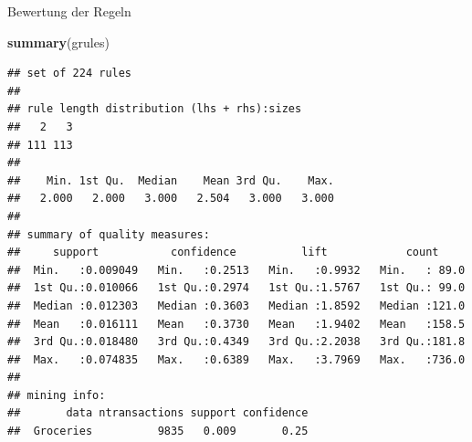 \documentclass[12pt,ngerman,a4paper,ignorenonframetext,]{beamer}
\newenvironment{Shaded}{\begin{snugshade}}{\end{snugshade}}
\newcommand{\KeywordTok}[1]{\textcolor[rgb]{0.13,0.29,0.53}{\textbf{#1}}}
\newcommand{\NormalTok}[1]{#1}
\begin{document}
\begin{frame}{Bewertung der Regeln}
\protect\hypertarget{bewertung-der-regeln}{}

\begin{Shaded}
\begin{Highlighting}[]
\KeywordTok{summary}\NormalTok{(grules)}
\end{Highlighting}
\end{Shaded}

\begin{verbatim}
## set of 224 rules
## 
## rule length distribution (lhs + rhs):sizes
##   2   3 
## 111 113 
## 
##    Min. 1st Qu.  Median    Mean 3rd Qu.    Max. 
##   2.000   2.000   3.000   2.504   3.000   3.000 
## 
## summary of quality measures:
##     support           confidence          lift            count      
##  Min.   :0.009049   Min.   :0.2513   Min.   :0.9932   Min.   : 89.0  
##  1st Qu.:0.010066   1st Qu.:0.2974   1st Qu.:1.5767   1st Qu.: 99.0  
##  Median :0.012303   Median :0.3603   Median :1.8592   Median :121.0  
##  Mean   :0.016111   Mean   :0.3730   Mean   :1.9402   Mean   :158.5  
##  3rd Qu.:0.018480   3rd Qu.:0.4349   3rd Qu.:2.2038   3rd Qu.:181.8  
##  Max.   :0.074835   Max.   :0.6389   Max.   :3.7969   Max.   :736.0  
## 
## mining info:
##       data ntransactions support confidence
##  Groceries          9835   0.009       0.25
\end{verbatim}

\end{frame}
\end{document}
